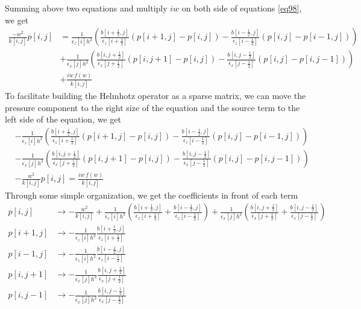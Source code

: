 \documentclass[revised,endfloat]{geophysics}
\begin{document}
Summing above two equations and multiply $iw$ on both side of equations \ref{eq98}, we get
\begin{equation}
\begin{split}
\frac{-w^2}{k[i,j]} p[i,j] &= \frac{1}{\epsilon_z[i] h^2} \left(  \frac{b[i+\frac{1}{2},j]}{\epsilon_z[i+\frac{1}{2}]} (p[i+1,j] - p[i,j]) - \frac{b[i-\frac{1}{2},j]}{\epsilon_z[i-\frac{1}{2}]} (p[i,j] - p[i-1,j])  \right) \\
&+ \frac{1}{\epsilon_x[j] h^2} \left( \frac{b[i,j+\frac{1}{2}]}{\epsilon_x[j+\frac{1}{2}]} (p[i,j+1] - p[i,j])   -   \frac{b[i,j-\frac{1}{2}]}{\epsilon_x[j-\frac{1}{2}]} (p[i,j] - p[i,j-1]) \right) \\
&+ \frac{iw \, f(w)}{k[i,j]}
\end{split}
\label{eq99}
\end{equation}
To facilitate building the Helmhotz operator as a sparse matrix, we can move the pressure component to the right size of the equation and the source term to the left side of the equation, we get 
\begin{equation}
\begin{split}
&- \frac{1}{\epsilon_z[i] h^2} \left(  \frac{b[i+\frac{1}{2},j]}{\epsilon_z[i+\frac{1}{2}]} (p[i+1,j] - p[i,j]) - \frac{b[i-\frac{1}{2},j]}{\epsilon_z[i-\frac{1}{2}]} (p[i,j] - p[i-1,j])  \right) \\
&- \frac{1}{\epsilon_x[j] h^2} \left( \frac{b[i,j+\frac{1}{2}]}{\epsilon_x[j+\frac{1}{2}]} (p[i,j+1] - p[i,j])   -   \frac{b[i,j-\frac{1}{2}]}{\epsilon_x[j-\frac{1}{2}]} (p[i,j] - p[i,j-1]) \right) \\
&- \frac{w^2}{k[i,j]} p[i,j] = \frac{iw \, f(w)}{k[i,j]} 
\end{split}  
\label{eq100}
\end{equation}
Through some simple organization, we get the coefficients in front of each term
\begin{equation}
\begin{split}
p[i,j] & \rightarrow -\frac{w^2}{k[i,j]} 
+ \frac{1}{\epsilon_z[i] h^2} \left( \frac{b[i+\frac{1}{2},j]}{\epsilon_z[i+\frac{1}{2}]} +  \frac{b[i-\frac{1}{2},j]}{\epsilon_z[i-\frac{1}{2}]} \right) 
+ \frac{1}{\epsilon_x[j] h^2} \left( \frac{b[i,j+\frac{1}{2}]}{\epsilon_x[j+\frac{1}{2}]} + \frac{b[i,j-\frac{1}{2}]}{\epsilon_x[j-\frac{1}{2}]} \right) \\
p[i+1,j] & \rightarrow -\frac{1}{\epsilon_z[i] h^2} \frac{b[i+\frac{1}{2},j]}{\epsilon_z[i+\frac{1}{2}]} \\
p[i-1,j] & \rightarrow -\frac{1}{\epsilon_z[i] h^2} \frac{b[i-\frac{1}{2},j]}{\epsilon_z[i-\frac{1}{2}]} \\
p[i,j+1] & \rightarrow -\frac{1}{\epsilon_x[j] h^2} \frac{b[i,j+\frac{1}{2}]}{\epsilon_x[j+\frac{1}{2}]} \\
p[i,j-1] & \rightarrow -\frac{1}{\epsilon_x[j] h^2} \frac{b[i,j-\frac{1}{2}]}{\epsilon_x[j-\frac{1}{2}]} 
\end{split}
\label{eq101}
\end{equation}
\end{document}
